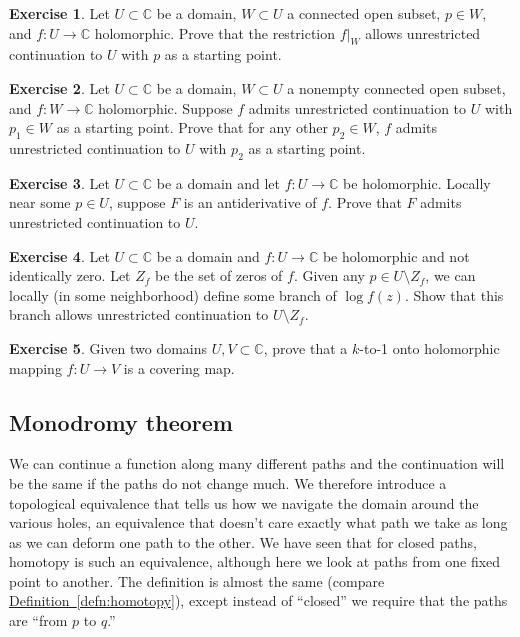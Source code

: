 \documentclass[12pt,openany]{book}
\newcommand{\C}{{\mathbb{C}}}
\newcommand{\myquote}[1]{``#1''}
\theoremstyle{plain}
\theoremstyle{remark}
\theoremstyle{definition}
\newenvironment{exbox}{%
    \def\FrameCommand{\vrule width 1pt \relax\hspace{10pt}}%
    \MakeFramed{\advance\hsize-\width\FrameRestore}%
}{%
    \endMakeFramed
}
\theoremstyle{exercise}
\newtheorem{exercise}{Exercise}[section]
\theoremstyle{example}
\newcommand{\defnref}[1]{\hyperref[#1]{Definition~\ref*{#1}}}
\begin{document}
\begin{exbox}
\begin{exercise}
Let $U \subset \C$ be a domain, $W \subset U$ a connected open subset,
$p \in W$, and $f \colon U \to \C$ holomorphic.  Prove that the restriction
$f|_W$ allows unrestricted continuation to $U$ with $p$ as a starting point.
\end{exercise}

\begin{exercise}%
\label{exercise:startingpointcont}
Let $U \subset \C$ be a domain, $W \subset U$ a nonempty connected open subset,
and $f \colon W \to \C$ holomorphic.  Suppose $f$ admits unrestricted
continuation to $U$ with $p_1 \in W$ as a starting point.  Prove
that for any other $p_2 \in W$, $f$ admits unrestricted continuation
to $U$ with $p_2$ as a starting point.
\end{exercise}

\begin{exercise}
Let $U \subset \C$ be a domain and let
$f \colon U \to \C$ be holomorphic.  Locally near some $p \in U$,
suppose $F$ is an antiderivative of $f$.  Prove that $F$ admits unrestricted
continuation to $U$.
\end{exercise}

\begin{exercise}
Let $U \subset \C$ be a domain and $f \colon U \to \C$ be holomorphic and
not identically zero.  Let $Z_f$ be the set of zeros of $f$.  Given any $p
\in U \setminus Z_f$, we can locally (in some neighborhood) define some branch of $\log f(z)$.
Show that this branch allows unrestricted continuation to $U \setminus Z_f$.
\end{exercise}

\begin{exercise}
Given two domains $U,V \subset \C$,
prove that a $k$-to-1 onto holomorphic mapping $f \colon U \to V$ is a covering map.
\end{exercise}
\end{exbox}

\subsection{Monodromy theorem}

We can continue a function along many different paths and the continuation
will be the same if the paths do not change much.  We therefore 
introduce a topological equivalence that tells us how we navigate the domain
around the various holes, an equivalence that doesn't care exactly what
path we take as long as we can deform one path to the other.
We have seen that for closed paths, homotopy is such an equivalence, although
here we look at paths from one fixed point to another.  The definition
is almost the same (compare \defnref{defn:homotopy}), except instead of
\myquote{closed} we require that the paths
are \myquote{from $p$ to $q$.}
\end{document}
